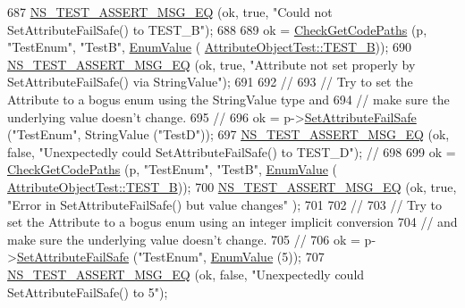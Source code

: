 \begin{DoxyCode}
687   \hyperlink{group__testing_ga2a9d78cffb3db8e867c35fff0b698cf5}{NS\_TEST\_ASSERT\_MSG\_EQ} (ok, \textcolor{keyword}{true}, \textcolor{stringliteral}{"Could not SetAttributeFailSafe() to TEST\_B"});
688 
689   ok = \hyperlink{classAttributeTestCase_a902fb84c803f1c898329f9263575331e}{CheckGetCodePaths} (p, \textcolor{stringliteral}{"TestEnum"}, \textcolor{stringliteral}{"TestB"}, \hyperlink{classns3_1_1EnumValue}{EnumValue} (
      \hyperlink{classAttributeObjectTest_a7d0dfe3f27ac6d9338a92781caf287cbacef47df5205983db654b3fc3cdb10865}{AttributeObjectTest::TEST\_B}));
690   \hyperlink{group__testing_ga2a9d78cffb3db8e867c35fff0b698cf5}{NS\_TEST\_ASSERT\_MSG\_EQ} (ok, \textcolor{keyword}{true}, \textcolor{stringliteral}{"Attribute not set properly by
       SetAttributeFailSafe() via StringValue"});
691 
692   \textcolor{comment}{//}
693   \textcolor{comment}{// Try to set the Attribute to a bogus enum using the StringValue type and }
694   \textcolor{comment}{// make sure the underlying value doesn't change.}
695   \textcolor{comment}{//}
696   ok = p->\hyperlink{classns3_1_1ObjectBase_aa7d333004e970f925a4ed5df275541b5}{SetAttributeFailSafe} (\textcolor{stringliteral}{"TestEnum"}, StringValue (\textcolor{stringliteral}{"TestD"}));
697   \hyperlink{group__testing_ga2a9d78cffb3db8e867c35fff0b698cf5}{NS\_TEST\_ASSERT\_MSG\_EQ} (ok, \textcolor{keyword}{false}, \textcolor{stringliteral}{"Unexpectedly could SetAttributeFailSafe() to
       TEST\_D"}); \textcolor{comment}{// }
698 
699   ok = \hyperlink{classAttributeTestCase_a902fb84c803f1c898329f9263575331e}{CheckGetCodePaths} (p, \textcolor{stringliteral}{"TestEnum"}, \textcolor{stringliteral}{"TestB"}, \hyperlink{classns3_1_1EnumValue}{EnumValue} (
      \hyperlink{classAttributeObjectTest_a7d0dfe3f27ac6d9338a92781caf287cbacef47df5205983db654b3fc3cdb10865}{AttributeObjectTest::TEST\_B}));
700   \hyperlink{group__testing_ga2a9d78cffb3db8e867c35fff0b698cf5}{NS\_TEST\_ASSERT\_MSG\_EQ} (ok, \textcolor{keyword}{true}, \textcolor{stringliteral}{"Error in SetAttributeFailSafe() but value changes"}
      );
701 
702   \textcolor{comment}{//}
703   \textcolor{comment}{// Try to set the Attribute to a bogus enum using an integer implicit conversion}
704   \textcolor{comment}{// and make sure the underlying value doesn't change.}
705   \textcolor{comment}{//}
706   ok = p->\hyperlink{classns3_1_1ObjectBase_aa7d333004e970f925a4ed5df275541b5}{SetAttributeFailSafe} (\textcolor{stringliteral}{"TestEnum"}, \hyperlink{classns3_1_1EnumValue}{EnumValue} (5));
707   \hyperlink{group__testing_ga2a9d78cffb3db8e867c35fff0b698cf5}{NS\_TEST\_ASSERT\_MSG\_EQ} (ok, \textcolor{keyword}{false}, \textcolor{stringliteral}{"Unexpectedly could SetAttributeFailSafe() to 5"});

\end{DoxyCode}
